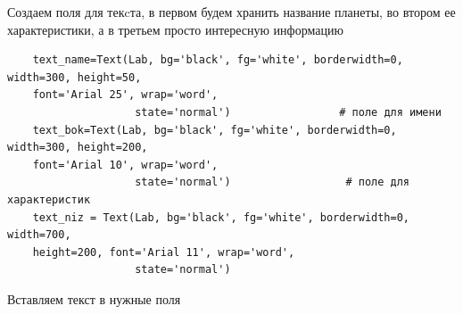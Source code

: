 \documentclass[11pt,a4paper]{report}
\begin{document}
Создаем  поля для текcта, в первом будем хранить название планеты, во втором ее характеристики, а в третьем просто интересную информацию
\begin{verbatim}
    text_name=Text(Lab, bg='black', fg='white', borderwidth=0, width=300, height=50, 
    font='Arial 25', wrap='word',
                    state='normal')                 # поле для имени
    text_bok=Text(Lab, bg='black', fg='white', borderwidth=0, width=300, height=200, 
    font='Arial 10', wrap='word',
                    state='normal')                  # поле для характеристик
    text_niz = Text(Lab, bg='black', fg='white', borderwidth=0, width=700, 
    height=200, font='Arial 11', wrap='word',
                    state='normal')           
\end{verbatim}


Вставляем текст в нужные поля  
\end{document}
